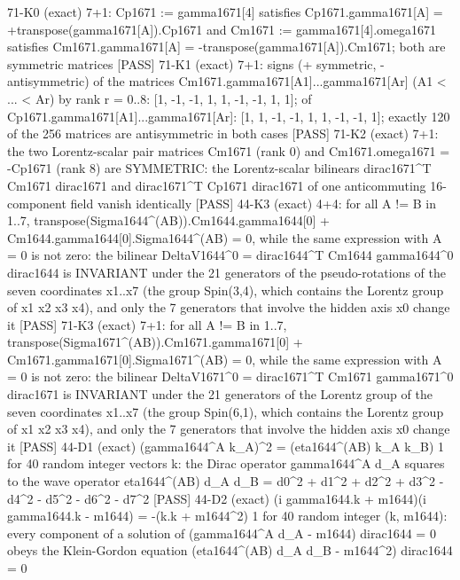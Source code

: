 \documentclass[
  10pt,
]{article}
\newenvironment{Shaded}{}{}
\newcommand{\NormalTok}[1]{#1}
\begin{document}
\begin{Shaded}
\begin{Highlighting}[]
\NormalTok{[PASS] 71{-}K0  (exact) 7+1: Cp1671 := gamma1671[4] satisfies Cp1671.gamma1671[A] = +transpose(gamma1671[A]).Cp1671 and Cm1671 := gamma1671[4].omega1671 satisfies Cm1671.gamma1671[A] = {-}transpose(gamma1671[A]).Cm1671; both are symmetric matrices}
\NormalTok{[PASS] 71{-}K1  (exact) 7+1: signs (+ symmetric, {-} antisymmetric) of the matrices Cm1671.gamma1671[A1]...gamma1671[Ar] (A1 \textless{} ... \textless{} Ar) by rank r = 0..8: [1, {-}1, {-}1, 1, 1, {-}1, {-}1, 1, 1]; of Cp1671.gamma1671[A1]...gamma1671[Ar]: [1, 1, {-}1, {-}1, 1, 1, {-}1, {-}1, 1]; exactly 120 of the 256 matrices are antisymmetric in both cases}
\NormalTok{[PASS] 71{-}K2  (exact) 7+1: the two Lorentz{-}scalar pair matrices Cm1671 (rank 0) and Cm1671.omega1671 = {-}Cp1671 (rank 8) are SYMMETRIC: the Lorentz{-}scalar bilinears dirac1671\^{}T Cm1671 dirac1671 and dirac1671\^{}T Cp1671 dirac1671 of one anticommuting 16{-}component field vanish identically}
\NormalTok{[PASS] 44{-}K3  (exact) 4+4: for all A != B in 1..7, transpose(Sigma1644\^{}(AB)).Cm1644.gamma1644[0] + Cm1644.gamma1644[0].Sigma1644\^{}(AB) = 0, while the same expression with A = 0 is not zero: the bilinear DeltaV1644\^{}0 = dirac1644\^{}T Cm1644 gamma1644\^{}0 dirac1644 is INVARIANT under the 21 generators of the pseudo{-}rotations of the seven coordinates x1..x7 (the group Spin(3,4), which contains the Lorentz group of x1 x2 x3 x4), and only the 7 generators that involve the hidden axis x0 change it}
\NormalTok{[PASS] 71{-}K3  (exact) 7+1: for all A != B in 1..7, transpose(Sigma1671\^{}(AB)).Cm1671.gamma1671[0] + Cm1671.gamma1671[0].Sigma1671\^{}(AB) = 0, while the same expression with A = 0 is not zero: the bilinear DeltaV1671\^{}0 = dirac1671\^{}T Cm1671 gamma1671\^{}0 dirac1671 is INVARIANT under the 21 generators of the Lorentz group of the seven coordinates x1..x7 (the group Spin(6,1), which contains the Lorentz group of x1 x2 x3 x4), and only the 7 generators that involve the hidden axis x0 change it}
\NormalTok{[PASS] 44{-}D1  (exact) (gamma1644\^{}A k\_A)\^{}2 = (eta1644\^{}(AB) k\_A k\_B) 1 for 40 random integer vectors k: the Dirac operator gamma1644\^{}A d\_A squares to the wave operator eta1644\^{}(AB) d\_A d\_B = d0\^{}2 + d1\^{}2 + d2\^{}2 + d3\^{}2 {-} d4\^{}2 {-} d5\^{}2 {-} d6\^{}2 {-} d7\^{}2}
\NormalTok{[PASS] 44{-}D2  (exact) (i gamma1644.k + m1644)(i gamma1644.k {-} m1644) = {-}(k.k + m1644\^{}2) 1 for 40 random integer (k, m1644): every component of a solution of (gamma1644\^{}A d\_A {-} m1644) dirac1644 = 0 obeys the Klein{-}Gordon equation (eta1644\^{}(AB) d\_A d\_B {-} m1644\^{}2) dirac1644 = 0}

\end{Highlighting}
\end{Shaded}
\end{document}

